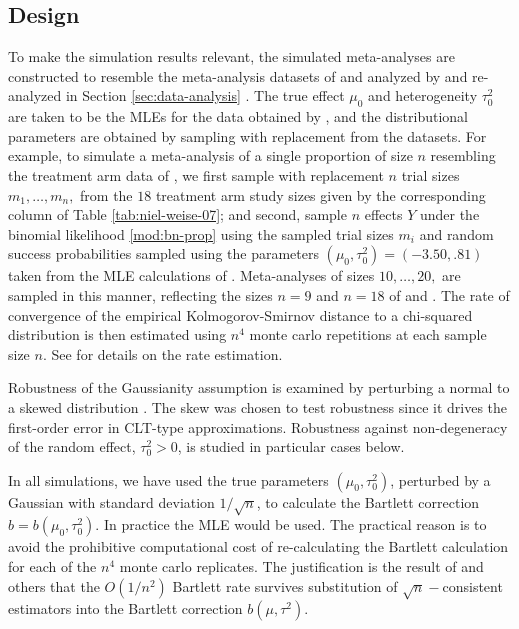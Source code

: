 \documentclass[12pt]{article}
\newcommand{\Y}{Y}
\newcommand{\n}{n}
\newcommand{\munull}{\mu_0}
\newcommand{\tausqnull}{\tau^2_{0}}
\begin{document}
\subsection{Design}
To make the simulation results relevant, the simulated meta-analyses
are constructed to resemble the meta-analysis datasets of \citet{niel:07} and \citet{niel:08}  analyzed by
\citet{stijnen:10} and re-analyzed in Section
\ref{sec:data-analysis}%
. The true effect $\munull$ and heterogeneity $\tausqnull$ are taken
to be the MLEs for the data obtained by \citet{stijnen:10}, and the
distributional parameters are obtained by sampling with replacement
from the datasets. For example, to simulate a meta-analysis of a
single proportion of size $\n$ resembling the treatment arm data of \citet{niel:07},
we first sample with replacement $\n$ trial sizes $m_1,\ldots,m_{\n},$
from the $18$ treatment arm study sizes given by the corresponding
column of Table \ref{tab:niel-weise-07}; and second, sample $\n$
effects $\Y$ under the binomial likelihood \eqref{mod:bn-prop} using
the sampled trial sizes $m_i$ and random success probabilities sampled using the parameters $(\munull,\tausqnull)=(-3.50,.81)$ taken from the
MLE calculations of \citet{stijnen:10}. Meta-analyses of sizes
$10,\ldots,20,$  are sampled in this manner, reflecting the sizes $\n=9$ and $\n=18$ of \citet{niel:07} and \citet{niel:08}. The
rate of convergence of the empirical Kolmogorov-Smirnov distance to a
chi-squared distribution is then estimated using $\n^4$ monte carlo
repetitions at each sample size $\n$. See \citet{michael:ma-bartlett}
for details on the rate estimation.

Robustness of the Gaussianity assumption is examined by perturbing a
normal to a skewed distribution \citep{jones:09}. The skew
was chosen to test robustness since it drives the first-order error in
CLT-type approximations. Robustness against non-degeneracy of the
random effect, $\tausqnull>0$, is studied in particular cases
below.%

In all simulations, we have used the true parameters
$(\munull,\tausqnull)$, perturbed by a Gaussian with standard deviation
$1/\sqrt\n$, to calculate the Bartlett correction
$b=b(\munull,\tausqnull)$. In practice the MLE would be used. The practical
reason is to avoid the prohibitive computational cost of
re-calculating the Bartlett calculation for each of the $\n^4$ monte
carlo replicates. The justification is the result of \citet{lawley:56,barndorff:88} and others that the $O(1/\n^2)$ Bartlett rate survives substitution of $\sqrt\n-$consistent estimators into the Bartlett correction $b(\mu,\tau^2)$.
\end{document}
